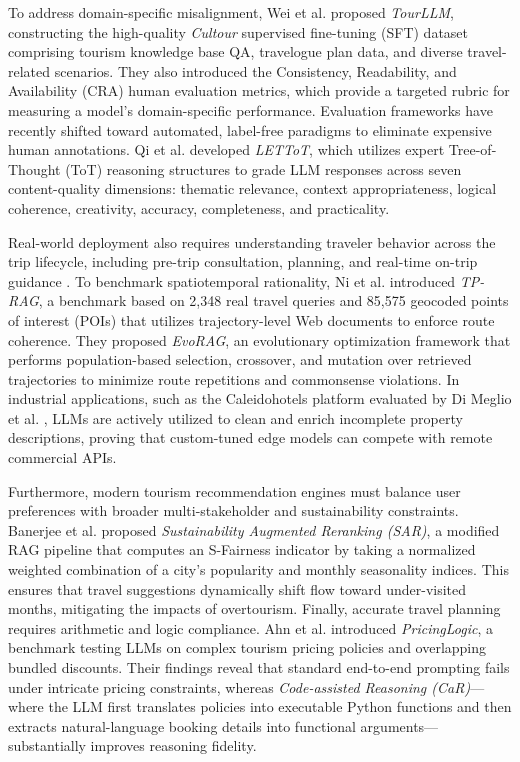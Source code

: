 \documentclass{ieeeaccess}
\begin{document}
To address domain-specific misalignment, Wei et al. \cite{tourllm-2024} proposed \emph{TourLLM}, constructing the high-quality \emph{Cultour} supervised fine-tuning (SFT) dataset comprising tourism knowledge base QA, travelogue plan data, and diverse travel-related scenarios. They also introduced the Consistency, Readability, and Availability (CRA) human evaluation metrics, which provide a targeted rubric for measuring a model’s domain-specific performance. Evaluation frameworks have recently shifted toward automated, label-free paradigms to eliminate expensive human annotations. Qi et al. \cite{qi-lettot-2025} developed \emph{LETToT}, which utilizes expert Tree-of-Thought (ToT) reasoning structures to grade LLM responses across seven content-quality dimensions: thematic relevance, context appropriateness, logical coherence, creativity, accuracy, completeness, and practicality. 

Real-world deployment also requires understanding traveler behavior across the trip lifecycle, including pre-trip consultation, planning, and real-time on-trip guidance \cite{qi-lettot-2025, ni-tprag-2025}. To benchmark spatiotemporal rationality, Ni et al. \cite{ni-tprag-2025} introduced \emph{TP-RAG}, a benchmark based on 2,348 real travel queries and 85,575 geocoded points of interest (POIs) that utilizes trajectory-level Web documents to enforce route coherence. They proposed \emph{EvoRAG}, an evolutionary optimization framework that performs population-based selection, crossover, and mutation over retrieved trajectories to minimize route repetitions and commonsense violations. In industrial applications, such as the Caleidohotels platform evaluated by Di Meglio et al. \cite{dimeglio-llm-travel-2025}, LLMs are actively utilized to clean and enrich incomplete property descriptions, proving that custom-tuned edge models can compete with remote commercial APIs.

Furthermore, modern tourism recommendation engines must balance user preferences with broader multi-stakeholder and sustainability constraints. Banerjee et al. \cite{banerjee-sustainable-2024} proposed \emph{Sustainability Augmented Reranking (SAR)}, a modified RAG pipeline that computes an S-Fairness indicator by taking a normalized weighted combination of a city's popularity and monthly seasonality indices. This ensures that travel suggestions dynamically shift flow toward under-visited months, mitigating the impacts of overtourism. Finally, accurate travel planning requires arithmetic and logic compliance. Ahn et al. \cite{pricinglogic-2024} introduced \emph{PricingLogic}, a benchmark testing LLMs on complex tourism pricing policies and overlapping bundled discounts. Their findings reveal that standard end-to-end prompting fails under intricate pricing constraints, whereas \emph{Code-assisted Reasoning (CaR)}—where the LLM first translates policies into executable Python functions and then extracts natural-language booking details into functional arguments—substantially improves reasoning fidelity.
\end{document}
